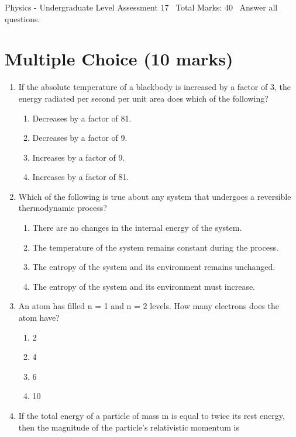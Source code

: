 \documentclass[12pt]{article}
\begin{document}
\begin{center}
Physics - Undergraduate Level Assessment 17 \
Total Marks: 40 \
Answer all questions.
\end{center}

\section*{Multiple Choice (10 marks)}
\begin{enumerate}[label=\arabic*.]
\item If the absolute temperature of a blackbody is increased by a factor of 3, the energy radiated per second per unit area does which of the following?
\begin{enumerate}[label=(\alph*)]
    \item Decreases by a factor of 81.
    \item Decreases by a factor of 9.
    \item Increases by a factor of 9.
    \item Increases by a factor of 81.
\end{enumerate}
\item Which of the following is true about any system that undergoes a reversible thermodynamic process?
\begin{enumerate}[label=(\alph*)]
    \item There are no changes in the internal energy of the system.
    \item The temperature of the system remains constant during the process.
    \item The entropy of the system and its environment remains unchanged.
    \item The entropy of the system and its environment must increase.
\end{enumerate}
\item An atom has filled n = 1 and n = 2 levels. How many electrons does the atom have?
\begin{enumerate}[label=(\alph*)]
    \item 2
    \item 4
    \item 6
    \item 10
\end{enumerate}
\item If the total energy of a particle of mass m is equal to twice its rest energy, then the magnitude of the particle's relativistic momentum is
\begin{enumerate}[label=(\alph*)]

\end{enumerate}
\end{enumerate}
\end{document}
